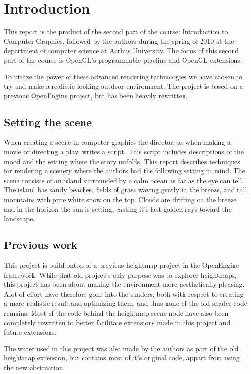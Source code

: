 
\chapter{Introduction}
This report is the product of the second part of the course:
Introduction to Computer Graphics, followed by the authors during the
spring of 2010 at the department of computer science at Aarhus
University. The focus of this second part of the course is OpenGL's
programmable pipeline and OpenGL extensions.

To utilize the power of these advanced rendering technologies we have
chosen to try and make a realistic looking outdoor environment. The
project is based on a previous OpenEngine project, but has been
heavily rewritten.


\section{Setting the scene}
When creating a scene in computer graphics the director, as when
making a movie or directing a play, writes a script. This script
includes descriptions of the mood and the setting where the story
unfolds.
%
This report describes techniques for rendering a scenery 
where the authors had the following setting in mind.
%
The scene consists of an island surrounded by a calm ocean as far
as the eye can tell. The island has sandy beaches, fields of grass
waving gently in the breeze, and tall mountains with pure white snow
on the top. Clouds are drifting on the breeze and in the horizon
the sun is setting, casting it's last golden rays toward the
landscape.

\section{Previous work}
This project is build ontop of a previous heightmap project in the
OpenEngine framework. While that old project's only purpose was to
explorer heightmaps, this project has been about making the
environment more aesthetically pleasing. Alot of effort have therefore
gone into the shaders, both with respect to creating a more realistic
result and optimizing them, and thus none of the old shader code
remains. Most of the code behind the heightmap scene node have also
been completely rewritten to better facilitate extensions made in this
project and future extensions.

The water used in this project was also made by the authors as part of
the old heightmap extension, but contains most of it's original code,
appart from using the new  abstraction.

